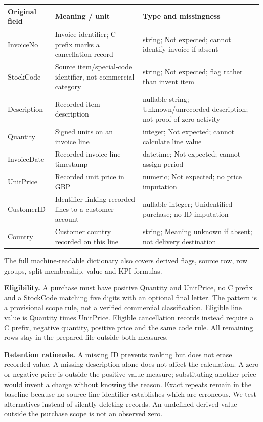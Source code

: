 \documentclass[10pt,a4paper]{article}
\begin{document}
{\small
\begin{tabularx}{\linewidth}{@{}YYY@{}}
\toprule
\textbf{Original field} & \textbf{Meaning / unit} & \textbf{Type and missingness} \\ \midrule
InvoiceNo & Invoice identifier; C prefix marks a cancellation record & string; Not expected; cannot identify invoice if absent \\
StockCode & Source item/special-code identifier, not commercial category & string; Not expected; flag rather than invent item \\
Description & Recorded item description & nullable string; Unknown/unrecorded description; not proof of zero activity \\
Quantity & Signed units on an invoice line & integer; Not expected; cannot calculate line value \\
InvoiceDate & Recorded invoice-line timestamp & datetime; Not expected; cannot assign period \\
UnitPrice & Recorded unit price in GBP & numeric; Not expected; no price imputation \\
CustomerID & Identifier linking recorded lines to a customer account & nullable integer; Unidentified purchase; no ID imputation \\
Country & Customer country recorded on this line & string; Meaning unknown if absent; not delivery destination \\
\bottomrule\end{tabularx}
}

The full machine-readable dictionary also covers derived flags, source row, row groups, split membership, value and KPI formulas.\par
\textbf{Eligibility.} A purchase must have positive Quantity and UnitPrice, no C prefix and a StockCode matching five digits with an optional final letter. The pattern is a provisional scope rule, not a verified commercial classification. Eligible line value is Quantity times UnitPrice. Eligible cancellation records instead require a C prefix, negative quantity, positive price and the same code rule. All remaining rows stay in the prepared file outside both measures.

\textbf{Retention rationale.} A missing ID prevents ranking but does not erase recorded value. A missing description alone does not affect the calculation. A zero or negative price is outside the positive-value measure; substituting another price would invent a charge without knowing the reason. Exact repeats remain in the baseline because no source-line identifier establishes which are erroneous. We test alternatives instead of silently deleting records. An undefined derived value outside the purchase scope is not an observed zero.
\end{document}
